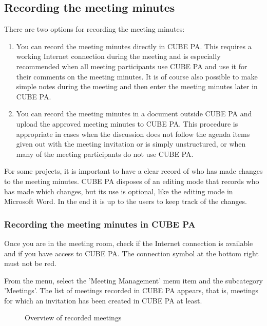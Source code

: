 \subsection{Recording the meeting minutes}

There are two options for recording the meeting minutes:

\begin{enumerate}
\item
You can record the meeting minutes directly in CUBE PA. This requires a working Internet connection during the meeting and is especially recommended when all meeting participants use CUBE PA and use it for their comments on the meeting minutes. 
It is of course also possible to make simple notes during the meeting and then enter the meeting minutes later in CUBE PA.
\item
You can record the meeting minutes in a document outside CUBE PA and upload the approved meeting minutes to CUBE PA. 
This procedure is appropriate in cases when the discussion does not follow the agenda items given out with the meeting invitation or is simply unstructured, or when many of the meeting participants do not use CUBE PA.
\end{enumerate}

For some projects, it is important to have a clear record of who has made changes to the meeting minutes. CUBE PA disposes of an editing mode that records who has made which changes, but its use is optional, like the editing mode in Microsoft Word. 
In the end it is up to the users to keep track of the changes.

\subsubsection{Recording the meeting minutes in CUBE PA}

Once you are in the meeting room, check if the Internet connection is available and if you have access to CUBE PA. The connection symbol at the bottom right must not be red.

\vspace{\baselineskip}

From the menu, select the 'Meeting Management' menu item and the subcategory 'Meetings'. The list of meetings recorded in CUBE PA appears, that is, meetings for which an invitation has been created in CUBE PA at least. 

\begin{figure}[H]
\caption{Overview of recorded meetings}
\end{figure}

